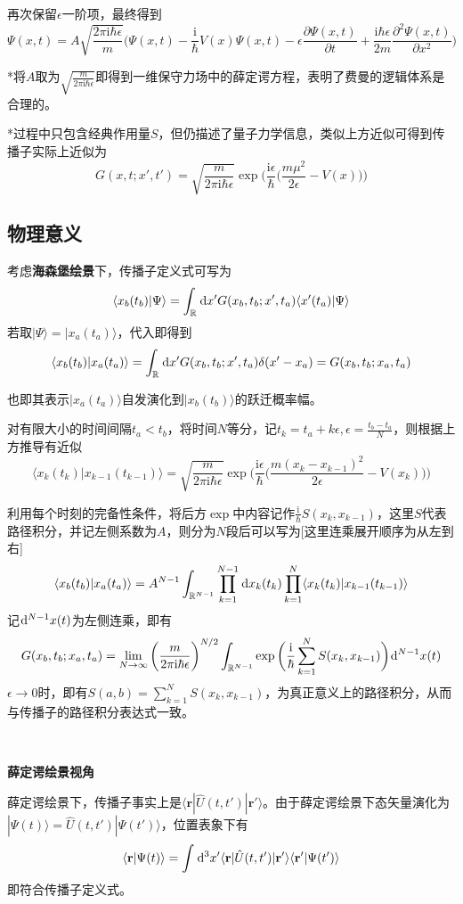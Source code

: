 \documentclass[a4paper,UTF8,fontset=windows]{ctexart}
\newcommand*{\dr}{\hspace{0.07em}\mathrm{d}}
\newcommand*{\ir}{\mathrm{i}}
\newcommand*{\ket}[1]{|#1\rangle}
\newcommand*{\bk}[2]{\langle#1|#2\rangle}
\newcommand*{\blk}[3]{\langle#1|#2|#3\rangle}
\newcommand*{\br}{\mathbf{r}}
\begin{document}
再次保留$\epsilon$一阶项，最终得到
$$\Psi(x,t)=A\sqrt{\frac{2\pi\ir\hbar\epsilon}{m}}\bigg(\Psi(x,t)-\frac{\ir}{\hbar}V(x)\Psi(x,t)-\epsilon\frac{\partial\Psi(x,t)}{\partial t}+\frac{\ir\hbar\epsilon}{2m}\frac{\partial^2\Psi(x,t)}{\partial x^2}\bigg)$$

*将$A$取为$\sqrt{\frac{m}{2\pi\ir\hbar\epsilon}}$即得到一维保守力场中的薛定谔方程，表明了费曼的逻辑体系是合理的。

*过程中只包含经典作用量$S$，但仍描述了量子力学信息，类似上方近似可得到传播子实际上近似为
$$G(x,t;x',t')=\sqrt{\frac{m}{2\pi\ir\hbar\epsilon}}\exp\bigg(\frac{\ir\epsilon}{\hbar}\bigg(\frac{m\mu^2}{2\epsilon}-V(x)\bigg)\bigg)$$

\subsection{物理意义}
考虑\textbf{海森堡绘景}下，传播子定义式可写为
$$\bk{x_b(t_b)}{\Psi}=\int_\mathbb{R}\dr x'G(x_b,t_b;x',t_a)\bk{x'(t_a)}{\Psi}$$
若取$\ket{\Psi}=\ket{x_a(t_a)}$，代入即得到
$$\bk{x_b(t_b)}{x_a(t_a)}=\int_\mathbb{R}\dr x'G(x_b,t_b;x',t_a)\delta(x'-x_a)=G(x_b,t_b;x_a,t_a)$$

也即其表示$\ket{x_a(t_a)}$自发演化到$\ket{x_b(t_b)}$的跃迁概率幅。

对有限大小的时间间隔$t_a<t_b$，将时间$N$等分，记$t_k=t_a+k\epsilon,\epsilon=\frac{t_b-t_a}{N}$，则根据上方推导有近似
$$\bk{x_k(t_k)}{x_{k-1}(t_{k-1})}=\sqrt{\frac{m}{2\pi\ir\hbar\epsilon}}\exp\bigg(\frac{\ir\epsilon}{\hbar}\bigg(\frac{m(x_k-x_{k-1})^2}{2\epsilon}-V(x_k)\bigg)\bigg)$$

利用每个时刻的完备性条件，将后方$\exp$中内容记作$\frac{\ir}{\hbar}S(x_k,x_{k-1})$，这里$S$代表路径积分，并记左侧系数为$A$，则分为$N$段后可以写为[这里连乘展开顺序为从左到右]
$$\bk{x_b(t_b)}{x_a(t_a)}=A^{N-1}\int_{\mathbb{R}^{N-1}}\prod_{k=1}^{N-1}\dr x_k(t_k)\prod_{k=1}^{N}\bk{x_k(t_k)}{x_{k-1}(t_{k-1})}$$
记$\dr^{N-1}x(t)$为左侧连乘，即有
$$G(x_b,t_b;x_a,t_a)=\lim_{N\to\infty}\bigg(\frac{m}{2\pi\ir\hbar\epsilon}\bigg)^{N/2}\int_{\mathbb{R}^{N-1}}\exp\bigg(\frac{\ir}{\hbar}\sum_{k=1}^NS(x_k,x_{k-1})\bigg)\dr^{N-1}x(t)$$
$\epsilon\to0$时，即有$S(a,b)=\sum_{k=1}^NS(x_k,x_{k-1})$，为真正意义上的路径积分，从而与传播子的路径积分表达式一致。

\

\textbf{薛定谔绘景视角}

薛定谔绘景下，传播子事实上是$\blk{\br}{\hat{U}(t,t')}{\br'}$。由于薛定谔绘景下态矢量演化为$\ket{\Psi(t)}=\hat{U}(t,t')\ket{\Psi(t')}$，位置表象下有
$$\bk{\br}{\Psi(t)}=\int\dr^3x'\blk{\br}{\hat{U}(t,t')}{\br'}\bk{\br'}{\Psi(t')}$$
即符合传播子定义式。
\end{document}
